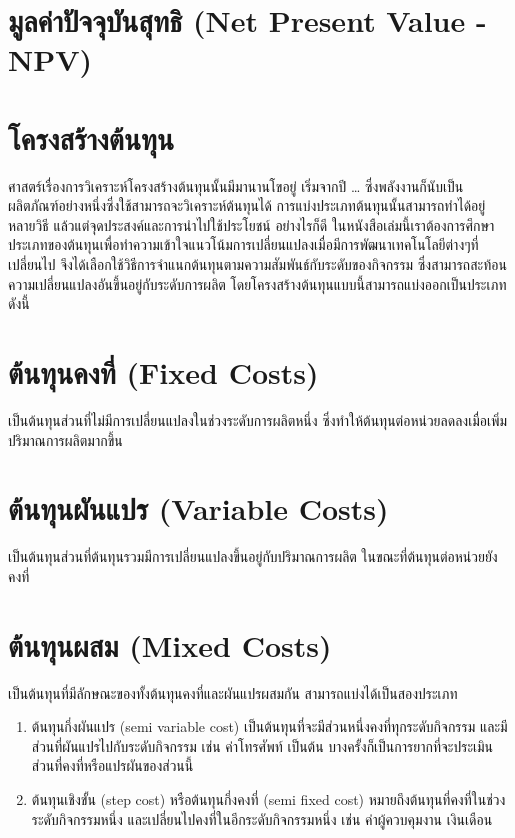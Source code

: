 \documentclass[a4paper,nobib,openany]{tufte-book}
\begin{document}
\section{มูลค่าปัจจุบันสุทธิ (Net Present Value - NPV)}
\label{sec:orga7a11d4}

\section{โครงสร้างต้นทุน}
\label{sec:org033043a}
ศาสตร์เรื่องการวิเคราะห์โครงสร้างต้นทุนนั้นมีมานานโขอยู่ เริ่มจากปี \ldots{}
ซึ่งพลังงานก็นับเป็นผลิตภัณฑ์อย่างหนึ่งซึ่งใช้สามารถจะวิเคราะห์ต้นทุนได้
การแบ่งประเภทต้นทุนนั้นสามารถทำได้อยู่หลายวิธี
แล้วแต่จุดประสงค์และการนำไปใช้ประโยชน์ อย่างไรก็ดี
ในหนังสือเล่มนี้เราต้องการศึกษาประเภทของต้นทุนเพื่อทำความเข้าใจแนวโน้มการเปลี่ยนแปลงเมื่อมีการพัฒนาเทคโนโลยีต่างๆที่เปลี่ยนไป
จึงได้เลือกใช้วิธีการจำแนกต้นทุนตามความสัมพันธ์กับระดับของกิจกรรม
ซึ่งสามารถสะท้อนความเปลี่ยนแปลงอันขึ้นอยู่กับระดับการผลิต
โดยโครงสร้างต้นทุนแบบนี้สามารถแบ่งออกเป็นประเภทดังนี้

\section{ต้นทุนคงที่ (Fixed Costs)}
\label{sec:org6a75308}
เป็นต้นทุนส่วนที่ไม่มีการเปลี่ยนแปลงในช่วงระดับการผลิตหนึ่ง
ซึ่งทำให้ต้นทุนต่อหน่วยลดลงเมื่อเพิ่มปริมาณการผลิตมากขึ้น

\section{ต้นทุนผันแปร (Variable Costs)}
\label{sec:orga8e4bf2}
เป็นต้นทุนส่วนที่ต้นทุนรวมมีการเปลี่ยนแปลงขึ้นอยู่กับปริมาณการผลิต
ในขณะที่ต้นทุนต่อหน่วยยังคงที่

\section{ต้นทุนผสม (Mixed Costs)}
\label{sec:org520ace0}
เป็นต้นทุนที่มีลักษณะของทั้งต้นทุนคงที่และผันแปรผสมกัน
สามารถแบ่งได้เป็นสองประเภท

\begin{enumerate}
\item ต้นทุนกึ่งผันแปร (semi variable cost)
เป็นต้นทุนที่จะมีส่วนหนึ่งคงที่ทุกระดับกิจกรรม
และมีส่วนที่ผันแปรไปกับระดับกิจกรรม เช่น ค่าโทรศัพท์ เป็นต้น
บางครั้งก็เป็นการยากที่จะประเมินส่วนที่คงที่หรือแปรผันของส่วนนี้

\item ต้นทุนเชิงขั้น (step cost) หรือต้นทุนกึ่งคงที่ (semi fixed cost)
หมายถึงต้นทุนที่คงที่ในช่วงระดับกิจกรรมหนึ่ง
และเปลี่ยนไปคงที่ในอีกระดับกิจกรรมหนึ่ง เช่น ค่าผู้ควบคุมงาน
เงินเดือน
\end{enumerate}
\end{document}
